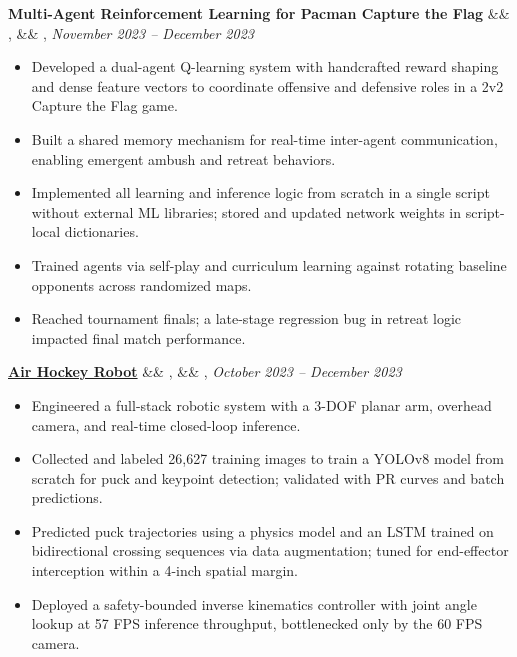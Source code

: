\documentclass[letterpaper,10pt]{article}
\newcommand{\experience}[5]{%
    \noindent\textbf{#1}%
    \ifx&#2&
    \else
        , \textit{#2}%
    \fi
    \ifx&#3&
    \else
        , #3%
    \fi
    \hfill \textit{#4} \\
    \vspace{-6.8mm}%
    \begin{itemize}[itemsep=-5pt]
        \setlength{\itemindent}{0em}
        #5
    \end{itemize}
    \vspace{1mm}
}
\begin{document}
\experience
    {Multi-Agent Reinforcement Learning for Pacman Capture the Flag}
    {}
    {}
    {November 2023 – December 2023}
    {
        \item Developed a dual-agent Q-learning system with handcrafted reward shaping and dense feature vectors to coordinate offensive and defensive roles in a 2v2 Capture the Flag game.
        \item Built a shared memory mechanism for real-time inter-agent communication, enabling emergent ambush and retreat behaviors.
        \item Implemented all learning and inference logic from scratch in a single script without external ML libraries; stored and updated network weights in script-local dictionaries.
        \item Trained agents via self-play and curriculum learning against rotating baseline opponents across randomized maps.
        \item Reached tournament finals; a late-stage regression bug in retreat logic impacted final match performance.
    }


\experience
    {\href{https://ryanbarry.me/projects/robotics/air-hockey-robot/}{Air Hockey Robot}}
    {}
    {}
    {October 2023 – December 2023}
    {
        \item Engineered a full-stack robotic system with a 3-DOF planar arm, overhead camera, and real-time closed-loop inference.
        \item Collected and labeled 26,627 training images to train a YOLOv8 model from scratch for puck and keypoint detection; validated with PR curves and batch predictions.
        \item Predicted puck trajectories using a physics model and an LSTM trained on bidirectional crossing sequences via data augmentation; tuned for end-effector interception within a 4-inch spatial margin.
        \item Deployed a safety-bounded inverse kinematics controller with joint angle lookup at 57 FPS inference throughput, bottlenecked only by the 60 FPS camera.
    }
\end{document}
